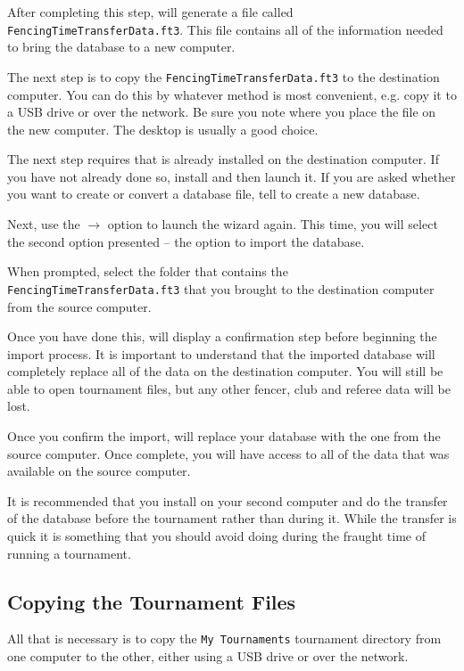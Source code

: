 \documentclass[a4paper,11pt]{memoir}
\begin{document}
After completing this step, \fencingtime{} will generate a file called \texttt{FencingTimeTransferData.ft3}. This file contains all of the information needed to bring the database to a new computer.

The next step is to copy the \texttt{FencingTimeTransferData.ft3} to the destination computer. You can do this by whatever method is most convenient, e.g. copy it to a USB drive or over the network. Be sure you note where you place the file on the new computer. The desktop is usually a good choice.

The next step requires that \fencingtime{} is already installed on the destination computer. If you have not already done so, install \fencingtime{} and then launch it. If you are asked whether you want to create or convert a database file, tell \fencingtime{} to create a new database. 

Next, use the  $\rightarrow$  option to launch the wizard again. This time, you will select the second option presented -- the option to import the database.

When prompted, select the folder that contains the \texttt{FencingTimeTransferData.ft3} that you brought to the destination computer from the source computer.

Once you have done this, \fencingtime{} will display a confirmation step before beginning the import process. It is important to understand that the imported database will completely replace all of the data on the destination computer. You will still be able to open tournament files, but any other fencer, club and referee data will be lost. 

Once you confirm the import, \fencingtime{} will replace your database with the one from the source computer. Once complete, you will have access to all of the data that was available on the source computer. 

It is recommended that you install \fencingtime{} on your second computer and do the transfer of the database before the tournament rather than during it. While the transfer is quick it is something that you should avoid doing during the fraught time of running a tournament.

\subsection{Copying the Tournament Files}

All that is necessary is to copy the \texttt{My Tournaments} tournament directory from one computer to the other, either using a USB drive or over the network.
\end{document}
